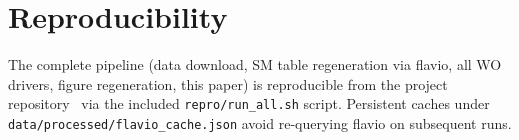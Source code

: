\documentclass[11pt]{article}
\begin{document}
\section*{Reproducibility}
The complete pipeline (data download, SM table regeneration via flavio,
all WO drivers, figure regeneration, this paper) is reproducible from
the project repository~\citep{vfdBAnomalyRepo} via the included
\texttt{repro/run\_all.sh} script. Persistent caches under
\texttt{data/processed/flavio\_cache.json} avoid re-querying flavio
on subsequent runs.



\end{document}
